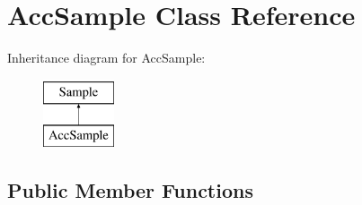 \hypertarget{class_acc_sample}{\section{Acc\-Sample Class Reference}
\label{class_acc_sample}
}
Inheritance diagram for Acc\-Sample\-:\begin{figure}[H]
\begin{center}
\leavevmode
\includegraphics[height=2.000000cm]{class_acc_sample}
\end{center}
\end{figure}
\subsection*{Public Member Functions}
